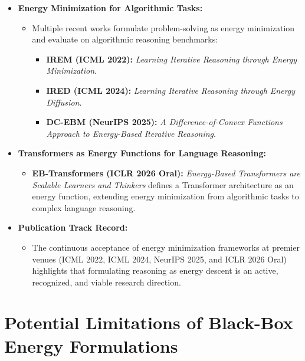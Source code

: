 \documentclass[11pt,a4paper]{article}
\begin{document}
\begin{itemize}[leftmargin=1.5em]
    \item \textbf{Energy Minimization for Algorithmic Tasks:}
    \begin{itemize}[leftmargin=1.2em]
        \item Multiple recent works formulate problem-solving as energy minimization and evaluate on algorithmic reasoning benchmarks:
        \begin{itemize}[leftmargin=1.2em]
            \item \textbf{IREM (ICML 2022):} \textit{Learning Iterative Reasoning through Energy Minimization}.
            \item \textbf{IRED (ICML 2024):} \textit{Learning Iterative Reasoning through Energy Diffusion}.
            \item \textbf{DC-EBM (NeurIPS 2025):} \textit{A Difference-of-Convex Functions Approach to Energy-Based Iterative Reasoning}.
        \end{itemize}
    \end{itemize}

    \item \textbf{Transformers as Energy Functions for Language Reasoning:}
    \begin{itemize}[leftmargin=1.2em]
        \item \textbf{EB-Transformers (ICLR 2026 Oral):} \textit{Energy-Based Transformers are Scalable Learners and Thinkers} defines a Transformer architecture as an energy function, extending energy minimization from algorithmic tasks to complex language reasoning.
    \end{itemize}

    \item \textbf{Publication Track Record:}
    \begin{itemize}[leftmargin=1.2em]
        \item The continuous acceptance of energy minimization frameworks at premier venues (ICML 2022, ICML 2024, NeurIPS 2025, and ICLR 2026 Oral) highlights that formulating reasoning as energy descent is an active, recognized, and viable research direction.
    \end{itemize}
\end{itemize}

\section{Potential Limitations of Black-Box Energy Formulations}
\label{sec:limitations}
\end{document}

